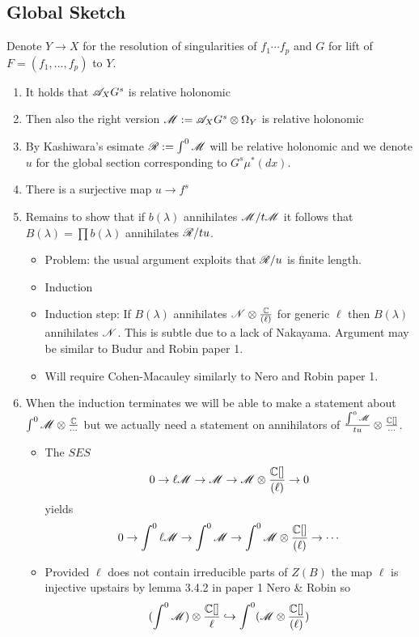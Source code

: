 \subsection{Global Sketch}
Denote $Y\to X$ for the resolution of singularities of $f_1\cdots f_p$ and $G$ for lift of $F = (f_1,\ldots, f_p)$ to $Y$.
\begin{enumerate}
  \item It holds that $\mathscr{A}_X G^s$ is relative holonomic
  \item Then also the right version $\mathscr{M} := \mathscr{A}_X G^s \otimes \Omega_Y$ is relative holonomic
  \item By Kashiwara's esimate $\mathscr{R} := \int^0 \mathscr{M} $ will be relative holonomic and we denote $u$ for the global section corresponding to $G^s \mu^*(dx)$.
  \item There is a surjective map $u\to f^s$
  \item Remains to show that if $b(\lambda)$ annihilates $\mathscr{M}/t\mathscr{M}$ it follows that $B(\lambda) = \prod b(\lambda)$ annihilates $\mathscr{R} /t u$.
  \begin{itemize}
    \item Problem: the usual argument exploits that $\mathscr{R}/u$ is finite length.
    \item Induction
    \item Induction step: If $B(\lambda)$ annihilates $\mathscr{N}\otimes \frac{\mathbb{C}}{(\ell)}$ for generic $\ell$ then $B(\lambda)$ annihilates $\mathscr{N}$. This is subtle due to a lack of Nakayama. Argument may be similar to Budur and Robin paper 1.
    \item Will require Cohen-Macauley similarly to Nero and Robin paper 1.
  \end{itemize}
  \item When the induction terminates we will be able to make a statement about $\int^0 \mathscr{M} \otimes \frac{\mathbb{C}}{\cdots}$ but we actually need a statement on annihilators of $\frac{\int^0 \mathscr{M}}{tu}\otimes \frac{\mathbb{C}[]}{\cdots}$.
  \begin{itemize}
    \item The $SES$
    $$ 0 \to \ell \mathscr{M} \to \mathscr{M} \to \mathscr{M} \otimes \frac{\mathbb{C}[]}{(\ell)} \to 0$$
    yields
    $$0 \to \int^0  \ell \mathscr{M} \to \int^0 \mathscr{M} \to \int^0 \mathscr{M} \otimes \frac{\mathbb{C}[]}{(\ell)}\to \cdots$$
    \item Provided $\ell$ does not contain irreducible parts of $Z(B)$ the map $\ell$ is injective upstairs by lemma 3.4.2 in paper 1 Nero & Robin so
    $$(\int^0 \mathscr{M} )\otimes \frac{\mathbb{C}[]}{\ell} \hookrightarrow \int^0 (\mathscr{M} \otimes \frac{\mathbb{C}[]}{(\ell)}) $$
  \end{itemize}

\end{enumerate}
